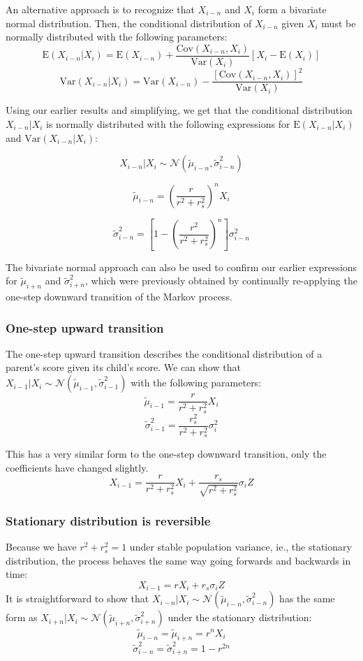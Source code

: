 \documentclass[a4paper,11pt]{article} %
\begin{document}
An alternative approach is to recognize that $X_{i-n}$ and $X_i$ form a bivariate normal distribution. Then, the conditional distribution of $X_{i-n}$ given $X_i$ must be normally distributed with the following parameters:
$$\mathrm{E}(X_{i-n}|X_i) = \mathrm{E}(X_{i-n}) + \frac{\mathrm{Cov}(X_{i-n}, X_i)}{\mathrm{Var}(X_i)}[X_i - \mathrm{E}(X_i)]$$
$$\mathrm{Var}(X_{i-n}|X_i) = \mathrm{Var}(X_{i-n}) - \frac{[\mathrm{Cov}(X_{i-n}, X_i)]^2}{\mathrm{Var}(X_i)}$$

Using our earlier results and simplifying, we get that the conditional distribution $X_{i-n}|X_i$ is normally distributed with the following expressions for $\mathrm{E}(X_{i-n}|X_i)$ and $\mathrm{Var}(X_{i-n}|X_i)$:

$$X_{i-n}|X_i \sim \mathcal{N}( \tilde{\mu}_{i-n}, \tilde{\sigma}_{i-n}^2)$$

$$\tilde{\mu}_{i-n} = (\frac{r}{r^2+r_s^2})^n X_i$$

$$\tilde{\sigma}_{i-n}^2 = [1 - (\frac{r^2}{r^2+r_s^2})^n] \sigma_{i-n}^2$$

The bivariate normal approach can also be used to confirm our earlier expressions for $\tilde{\mu}_{i+n}$ and $\tilde{\sigma}_{i+n}^2$, which were previously obtained by continually re-applying the one-step downward transition of the Markov process.

\subsubsection*{One-step upward transition}
The one-step upward transition describes the conditional distribution of a parent's score given its child's score. We can show that $X_{i-1}|X_i \sim \mathcal{N}( \tilde{\mu}_{i-1}, \tilde{\sigma}_{i-1}^2)$ with the following parameters:
$$\tilde{\mu}_{i-1} = \frac{r}{r^2+r_s^2} X_i$$
$$\tilde{\sigma}_{i-1}^2 = \frac{r_s^2}{r^2+r_s^2} \sigma_i^2$$

This has a very similar form to the one-step downward transition, only the coefficients have changed slightly.
$$X_{i-1} = \frac{r}{r^2+r_s^2} X_i + \frac{r_s}{\sqrt{r^2+r_s^2}} \sigma_{i} Z$$


\subsubsection*{Stationary distribution is reversible}

Because we have $r^2+r_s^2 = 1$ under stable population variance, ie., the stationary distribution, the process behaves the same way going forwards and backwards in time:
$$X_{i-1} = r X_i + r_s \sigma_{i} Z$$
It is straightforward to show that $X_{i-n}|X_i \sim \mathcal{N}( \tilde{\mu}_{i-n}, \tilde{\sigma}_{i-n}^2)$ has the same form as $X_{i+n}|X_i \sim \mathcal{N}( \tilde{\mu}_{i+n}, \tilde{\sigma}_{i+n}^2)$ under the stationary distribution:
$$\tilde{\mu}_{i-n} = \tilde{\mu}_{i+n} = r^nX_i$$
$$\tilde{\sigma}_{i-n}^2 = \tilde{\sigma}_{i+n}^2 = 1-r^{2n}$$
\end{document}
